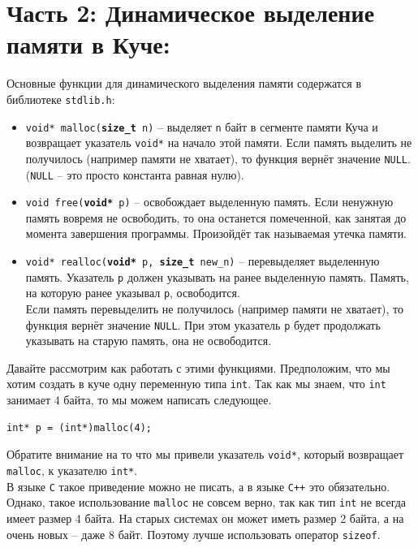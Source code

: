 \documentclass{article}
\begin{document}
\newpage
\section*{Часть 2: Динамическое выделение памяти в Куче:}
Основные функции для динамического выделения памяти содержатся в библиотеке \texttt{stdlib.h}:
\begin{itemize}
\item \texttt{void* malloc(\textbf{size\_t} n)} -- выделяет \texttt{n} байт в сегменте памяти Куча и возвращает указатель \texttt{void*}
на начало этой памяти. Если память выделить не получилось (например памяти не хватает), то функция вернёт значение \texttt{NULL}. (\texttt{NULL} -- это просто константа равная нулю). \\
\item \texttt{void free(\textbf{void*} p)} -- освобождает выделенную память. Если ненужную память вовремя не освободить, то она останется помеченной, как занятая до момента завершения программы. Произойдёт так называемая утечка памяти.\\
\item \texttt{void* realloc(\textbf{void*} p, \textbf{size\_t} new\_n)} -- перевыделяет выделенную память. Указатель \texttt{p} должен указывать на ранее выделенную память. Память, на которую ранее указывал \texttt{p}, освободится. \\
Если память перевыделить не получилось (например памяти не хватает), то функция вернёт значение \texttt{NULL}. При этом указатель \texttt{p} будет продолжать указывать на старую память, она не освободится.\\
\end{itemize}

Давайте рассмотрим как работать с этими функциями. Предположим, что мы хотим создать в куче одну переменную типа \texttt{int}. Так как мы знаем, что \texttt{int} занимает 4 байта, то мы можем написать следующее.
\begin{lstlisting}
int* p = (int*)malloc(4);
\end{lstlisting}
Обратите внимание на то что мы привели указатель \texttt{void*}, который возвращает \texttt{malloc}, к указателю \texttt{int*}.\\
В языке \texttt{C} такое приведение можно не писать, а в языке \texttt{C++} это обязательно. Однако, такое использование \texttt{malloc} не совсем верно, так как тип \texttt{int} не всегда имеет размер 4 байта. На старых системах он может иметь размер 2 байта, а на очень новых -- даже 8 байт. Поэтому лучше использовать оператор \texttt{sizeof}.\\
\end{document}
